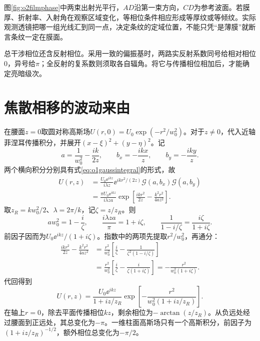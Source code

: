图\ref{fig:o2filmphase}中两束出射光平行，$AD$沿第一束方向，$CD$为参考波面。若膜厚、折射率、入射角在观察区域变化，等相位条件相应形成等厚纹或等倾纹。实际观测透镜把哪一组光线汇到同一点，决定条纹的定域位置，不能只凭“是薄膜”就断言条纹一定在膜面。

总干涉相位还含反射相位。采用一致的偏振基时，两路实反射系数同号给相对相位0，异号给$\pi$；全反射的复系数则须取各自辐角。将它与传播相位相加后，才能确定亮暗级次。

\section{焦散相移的波动来由}
在腰面$z=0$取圆对称高斯场$U(r,0)=U_0\exp(-r^2/w_0^2)$。对于$z\ne0$，代入近轴菲涅耳传播积分，并展开$(x-\xi)^2+(y-\eta)^2$。记
\[
 a=\frac1{w_0^2}-\frac{ik}{2z},\qquad
 b_x=-\frac{ikx}{z},\qquad b_y=-\frac{iky}{z}.
\]
两个横向积分分别具有式\eqref{eq:o1gaussintegral}的形式，故
\begin{align*}
 U(r,z)&=\frac{U_0\ee^{ikz}}{i\lambda z}\ee^{ikr^2/(2z)}
 \mathcal G(a,b_x)\mathcal G(a,b_y)\\
 &=\frac{\pi U_0\ee^{ikz}}{i\lambda za}
 \exp\left[\frac{ikr^2}{2z}-\frac{k^2r^2}{4az^2}\right].
\end{align*}
取$z_R=kw_0^2/2$、$\lambda=2\pi/k$，记$\zeta=z/z_R$。则
\[
 aw_0^2=1-\frac{i}{\zeta},\qquad
 \frac{i\lambda za}{\pi}=1+i\zeta,\qquad
 \frac1{1-i/\zeta}=\frac{i\zeta}{1+i\zeta}.
\]
前因子因而为$U_0\ee^{ikz}/(1+i\zeta)$。指数中的两项先提取$r^2/w_0^2$，再通分：
\begin{align*}
 \frac{ikr^2}{2z}-\frac{k^2r^2}{4az^2}
 &=\frac{r^2}{w_0^2}
 \left[\frac i\zeta-\frac1{\zeta^2(1-i/\zeta)}\right]\\
 &=\frac{r^2}{w_0^2}
 \left[\frac i\zeta-\frac{i}{\zeta(1+i\zeta)}\right]
 =-\frac{r^2}{w_0^2(1+i\zeta)}.
\end{align*}
代回得到
\[
 U(r,z)=\frac{U_0\ee^{ikz}}{1+iz/z_R}
 \exp\left[-\frac{r^2}{w_0^2(1+iz/z_R)}\right].
\]
在轴上$r=0$，除去平面传播相位$kz$，剩余相位为$-\arctan(z/z_R)$。从负远处经过腰面到正远处，其总变化为$-\pi$。一维柱面高斯场只有一个高斯积分，前因子为$(1+iz/z_R)^{-1/2}$，额外相位总变化为$-\pi/2$。

